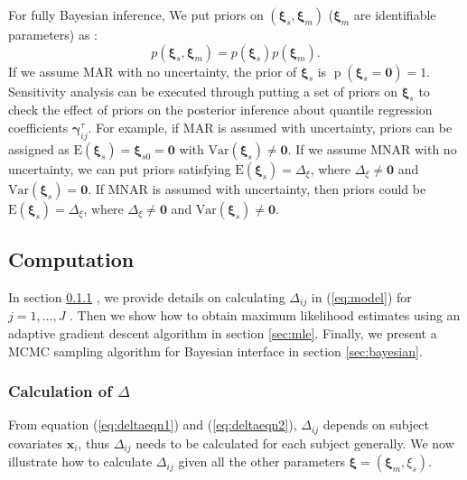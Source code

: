 \documentclass[12pt]{article}
\DeclareMathOperator{\pr}{p}
\begin{document}
For fully Bayesian inference, We put priors on $(\bm \xi_s, \bm
\xi_m)$ ($\bm \xi_m$ are identifiable parameters) as :
\begin{displaymath}
  p(\bm \xi_s, \bm \xi_m) = p(\bm \xi_s) p(\bm \xi_m).
\end{displaymath}
If we assume MAR with no uncertainty, the prior of $\bm \xi_s$ is
$\pr(\bm \xi_s = \bm 0) = 1$. Sensitivity analysis can be executed
through putting a set of priors on $\bm \xi_s$ to check the effect of
priors on the posterior inference about quantile regression
coefficients $\bm \gamma_{ij}^{\tau}$. For example, if MAR is assumed
with uncertainty, priors can be assigned as $\textrm{E}(\bm \xi_s) =
\bm \xi_{s0} = \bm 0$ with $\textrm{Var}(\bm \xi_s) \neq \bm 0$. If we
assume MNAR with no uncertainty, we can put priors satisfying
$\textrm{E}(\bm \xi_s) = \Delta_{\xi}$, where $\Delta_{\xi} \neq \bm
0$ and $\textrm{Var}(\bm \xi_s) = \bm 0$. If MNAR is assumed with
uncertainty, then priors could be $\textrm{E}(\bm \xi_s) =
\Delta_{\xi}$, where $\Delta_{\xi} \neq \bm 0 $ and $\textrm{Var}(\bm
\xi_s) \neq \bm 0$.

\subsection{Computation}
\label{sec:computation}

In section \ref{sec:deltacal} , we provide details on  calculating
$\Delta_{ij}$ in  (\ref{eq:model}) for $j = 1, \ldots, J$ . Then
we show how to obtain maximum likelihood estimates using an adaptive
gradient descent algorithm in section \ref{sec:mle}. Finally, we present
a MCMC  sampling algorithm  for Bayesian interface in section \ref{sec:bayesian}.

\subsubsection{Calculation of $\Delta$ }
\label{sec:deltacal}
From equation (\ref{eq:deltaeqn1}) and (\ref{eq:deltaeqn2}),
$\Delta_{ij}$ depends on subject covariates $\bm x_i$, thus
$\Delta_{ij}$ needs to be calculated for each subject generally. We
now illustrate how to calculate $\Delta_{ij}$ given all the other
parameters $\bm \xi = (\bm \xi_m, \xi_s)$.
\end{document}

